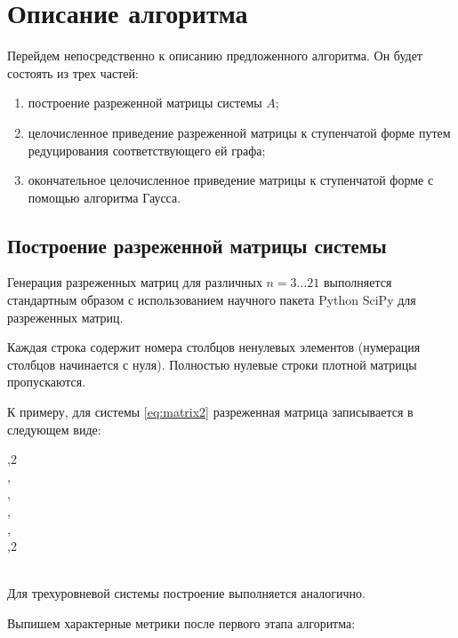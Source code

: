 \section{Описание алгоритма}\label{sec:ch4/sect3}

Перейдем непосредственно к описанию предложенного алгоритма.
Он будет состоять из трех частей:
\begin{enumerate}
	\item{построение разреженной матрицы системы $A$};
	\item{целочисленное приведение разреженной матрицы к ступенчатой форме путем редуцирования соответствующего ей графа};
	\item{окончательное целочисленное приведение матрицы к ступенчатой форме с помощью
		алгоритма Гаусса}.
\end{enumerate}

\subsection{Построение разреженной матрицы системы}\label{subsec:ch4/subsect1}
Генерация разреженных матриц для различных $n = 3\dots21$ выполняется стандартным
образом с использованием научного пакета Python SciPy для разреженных матриц.

Каждая строка содержит номера столбцов ненулевых элементов (нумерация столбцов
начинается с нуля). Полностью нулевые строки плотной матрицы пропускаются.

К примеру, для системы \eqref{eq:matrix2} разреженная матрица записывается в следующем виде:
\begin{flushleft}
	\noindent {},2\\
	\noindent{},\\
	\noindent{},\\
	\noindent{},\\
	\noindent{},\\
	\noindent{},2\\
\end{flushleft}\label{eq:sparse_matrix2}
\
\\[12pt]
\noindent Для трехуровневой системы построение выполняется аналогично.

\clearpage
\noindent Выпишем характерные метрики после первого этапа алгоритма:

